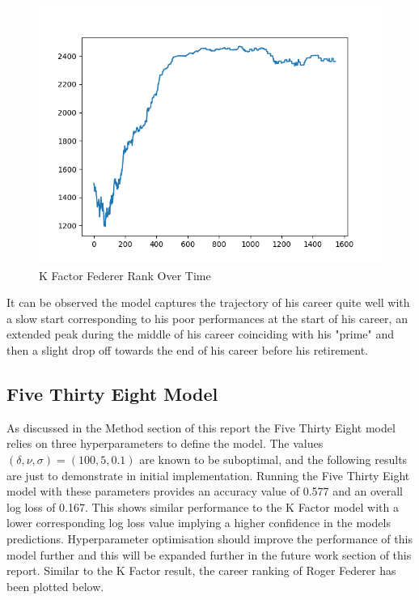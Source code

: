 \documentclass[12pt,a4paper]{article}
\begin{document}
\begin{figure}[H]
  \centering
  \includegraphics[scale=0.8]{images/federer_k_factor.png}
  \caption{K Factor Federer Rank Over Time}
  \label{fig:federer-kfactor}
\end{figure}

It can be observed the model captures the trajectory of his career quite well with a slow
start corresponding to his poor performances at the start of his career, an extended peak
during the middle of his career coinciding with his "prime" and then a slight drop off
towards the end of his career before his retirement.

\subsection{Five Thirty Eight Model}
As discussed in the Method section of this report the Five Thirty Eight model relies on
three hyperparameters to define the model. The values $(\delta,\nu,\sigma) = (100,5,0.1)$
are known to be suboptimal, and the following results are just to demonstrate in initial
implementation.
Running the Five Thirty Eight model with these parameters provides an accuracy value of
0.577 and an overall log loss of 0.167. This shows similar performance to the K Factor model
with a lower corresponding log loss value implying a higher confidence in the models predictions.
Hyperparameter optimisation should improve the performance of this model further and this
will be expanded further in the future work section of this report. Similar to the K Factor
result, the career ranking of Roger Federer has been plotted below.
\end{document}
